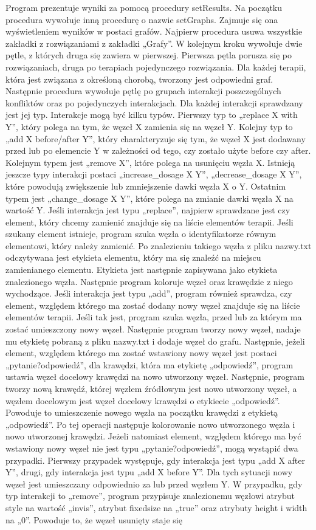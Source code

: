 \documentclass[oneside,a4paper]{book}
\begin{document}
\begin{spacing}{1.5}
Program prezentuje wyniki za pomocą procedury setResults. Na początku procedura wywołuje inną procedurę o nazwie setGraphs. Zajmuje się ona wyświetleniem wyników w postaci grafów. Najpierw procedura usuwa wszystkie zakładki z rozwiązaniami z zakładki „Grafy”. W kolejnym kroku wywołuje dwie pętle, z których druga się zawiera w pierwszej. Pierwsza pętla porusza się po rozwiązaniach, druga po terapiach pojedynczego rozwiązania. Dla każdej terapii, która jest związana z określoną chorobą, tworzony jest odpowiedni graf. Następnie procedura wywołuje pętlę po grupach interakcji poszczególnych konfliktów oraz po pojedynczych interakcjach. Dla każdej interakcji sprawdzany jest jej typ. Interakcje mogą być kilku typów. Pierwszy typ to „replace X with Y”, który polega na tym, że węzeł X zamienia się na węzeł Y. Kolejny typ to „add X before/after Y”, który charakteryzuje się tym, że węzeł X jest dodawany przed lub po elemencie Y w zależności od tego, czy zostało użyte before czy after. Kolejnym typem jest „remove X”, które polega na usunięciu węzła X. Istnieją jeszcze typy interakcji postaci „increase\_dosage X Y”, „decrease\_dosage X Y”, które powodują zwiększenie lub zmniejszenie dawki węzła X o Y. Ostatnim typem jest „change\_dosage X Y”, które polega na zmianie dawki węzła X na wartość Y.  Jeśli interakcja jest typu „replace”, najpierw sprawdzane jest czy element, który chcemy zamienić znajduje się na liście elementów terapii. Jeśli szukany element istnieje, program szuka węzła o identyfikatorze równym elementowi, który należy zamienić. Po znalezieniu takiego węzła z pliku nazwy.txt odczytywana jest etykieta elementu, który ma się znaleźć na miejscu zamienianego elementu. Etykieta jest następnie zapisywana jako etykieta znalezionego węzła. Następnie program koloruje węzeł oraz krawędzie z niego wychodzące. Jeśli interakcja jest typu „add”, program również sprawdza, czy element, względem którego ma zostać dodany nowy węzeł znajduje się na liście elementów terapii. Jeśli tak jest, program szuka węzła, przed lub za którym ma zostać umieszczony nowy węzeł. Następnie program tworzy nowy węzeł, nadaje mu etykietę pobraną z pliku nazwy.txt i dodaje węzeł do grafu. Następnie, jeżeli element, względem którego ma zostać wstawiony nowy węzeł jest postaci „pytanie?odpowiedź”, dla krawędzi, która ma etykietę „odpowiedź”, program ustawia węzeł docelowy krawędzi na nowo utworzony węzeł. Następnie, program tworzy nową krawędź, której węzłem źródłowym jest nowo utworzony węzeł, a węzłem docelowym jest węzeł docelowy krawędzi o etykiecie „odpowiedź”. Powoduje to umieszczenie nowego węzła na początku krawędzi z etykietą „odpowiedź”. Po tej operacji następuje kolorowanie nowo utworzonego węzła i nowo utworzonej krawędzi. Jeżeli natomiast element, względem którego ma być wstawiony nowy węzeł nie jest typu „pytanie?odpowiedź”, mogą wystąpić dwa przypadki. Pierwszy przypadek występuje, gdy interakcja jest typu „add X after Y”, drugi, gdy interakcja jest typu „add X before Y”. Dla tych sytuacji nowy węzeł jest umieszczany odpowiednio za lub przed węzłem Y. W przypadku, gdy typ interakcji to „remove”, program przypisuje znalezionemu węzłowi atrybut style na wartość „invis”, atrybut fixedsize na „true” oraz atrybuty height i width na „0”. Powoduje to, że węzeł usunięty staje się 
\end{spacing}
\end{document}
